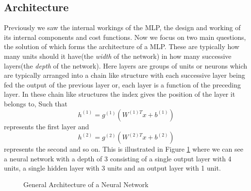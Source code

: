 \documentclass[14pt]{extarticle}
\numberwithin{equation}{section}
\begin{document}
	\subsection{Architecture}
	Previously we saw the internal workings of the MLP, the design and working of its internal components and cost functions. Now we focus on two main questions, the solution of which forms the architecture of a MLP. These are typically how many units should it have(the \textit{width} of the network) in how many successive layers(the \textit{depth} of the network). Here layers are groups of units or neurons which are typically arranged into a chain like structure with each successive layer being fed the output of the previous layer or, each layer is a function of the preceding layer. In these chain like structures the index gives the position of the layer it belongs to, Such that $$h^{(1)} = g^{(1)}(W^{(1)T}x + b^{(1)})$$ represents the first layer and $$h^{(2)} = g^{(2)}(W^{(2)T}x + b^{(2)})$$ represents the second\cite{Goodfellow-et-al-2016} and so on. This is illustrated in Figure \ref{nn_arch} where we can see a neural network with a depth of 3 consisting of a single output layer with 4 units, a single hidden layer with 3 units and an output layer with 1 unit.
	\begin{figure}[H]
		\centering
		\setlength{\fboxsep}{5pt}%
		\setlength{\fboxrule}{1pt}%
		\caption{General Architecture of a Neural Network
			\label{nn_arch}}
	\end{figure}
\end{document}
